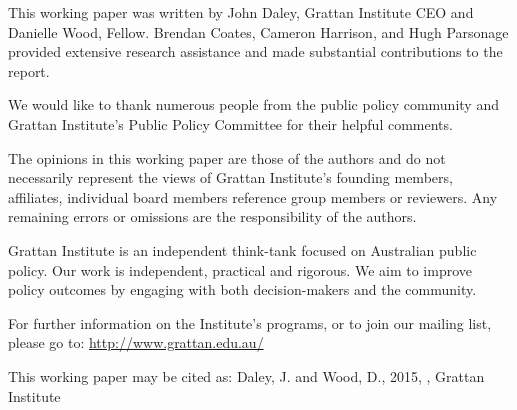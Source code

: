 This working paper was written by John Daley, Grattan Institute CEO and
Danielle Wood, Fellow. Brendan Coates, Cameron Harrison, and Hugh
Parsonage provided extensive research assistance and made substantial
contributions to the report. 

We would like to thank numerous people from the public policy community and
Grattan Institute's Public Policy Committee for their helpful comments.

The opinions in this working paper are those of the authors and do not
necessarily represent the views of Grattan Institute's founding members,
affiliates, individual board members reference group members or reviewers. Any
remaining errors or omissions are the responsibility of the authors.


Grattan Institute is an independent think-tank focused on Australian public
policy. Our work is independent, practical and rigorous. We aim to improve
policy outcomes by engaging with both decision-makers and the community. 

For further information on the Institute's programs, or to join our mailing list,
please go to: \url{http://www.grattan.edu.au/}

{\small
This working paper may be cited as: Daley, J. and Wood, D., 2015, \textit{\mytitle}, Grattan Institute 
}
